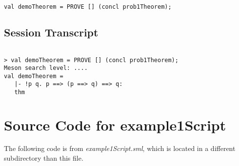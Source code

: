 \documentclass{report}
\begin{document}
\begin{lstlisting}[frame=trBL]
val demoTheorem = PROVE [] (concl prob1Theorem);  
\end{lstlisting}

\section{Session Transcript}
\label{sec:session-transcript-1}

\begin{session}
  \begin{scriptsize}
\begin{verbatim}

> val demoTheorem = PROVE [] (concl prob1Theorem);
Meson search level: ....
val demoTheorem =
   |- !p q. p ==> (p ==> q) ==> q:
   thm
\end{verbatim}
  \end{scriptsize}
\end{session}


\appendix{} 


\renewcommand{\thechapter}{\Alph{chapter}} 

\chapter{Source Code for example1Script}
\label{cha:source-code-sample}

The following code is from \emph{example1Script.sml}, which is located
in a different subdirectory than this file.

\end{document}
